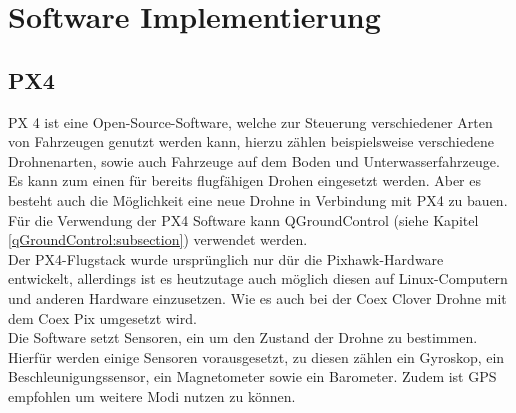 \chapter{Software Implementierung}

\section{PX4} \label{px4:section}
PX 4 ist eine Open-Source-Software, welche zur Steuerung verschiedener Arten von Fahrzeugen genutzt werden kann, hierzu zählen beispielsweise verschiedene Drohnenarten, sowie auch Fahrzeuge auf dem Boden und Unterwasserfahrzeuge.\\ Es kann zum einen für bereits flugfähigen Drohen eingesetzt werden. Aber es besteht auch die Möglichkeit eine neue Drohne in Verbindung mit PX4 zu bauen.\\
Für die Verwendung der PX4 Software kann QGroundControl (siehe Kapitel \ref{qGroundControl:subsection}) verwendet werden. \cite[vgl.][]{px4} \\
Der PX4-Flugstack wurde ursprünglich nur dür die Pixhawk-Hardware entwickelt, allerdings ist es heutzutage auch möglich diesen auf Linux-Computern und anderen Hardware einzusetzen. Wie es auch bei der Coex Clover Drohne mit dem Coex Pix umgesetzt wird. \\
Die Software setzt Sensoren, ein um den Zustand der Drohne zu bestimmen. Hierfür werden einige Sensoren vorausgesetzt, zu diesen zählen ein Gyroskop, ein Beschleunigungssensor, ein Magnetometer sowie ein Barometer. Zudem ist GPS empfohlen um weitere Modi nutzen zu können. \cite[vgl.][]{px4}


